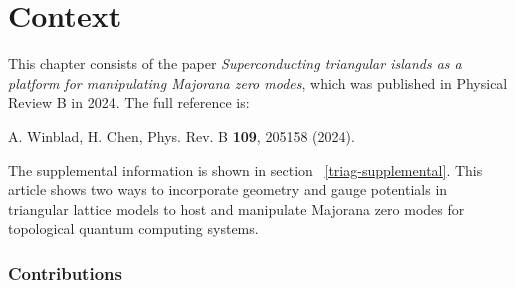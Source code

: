 \section{Context}

This chapter consists of the paper \textit{Superconducting triangular islands as a platform for manipulating Majorana zero modes}, which was published in Physical Review B in 2024. The full reference is:

A. Winblad, H. Chen, Phys. Rev. B \textbf{109}, 205158 (2024).

The supplemental information is shown in section ~\ref{triag-supplemental}.
This article shows two ways to incorporate geometry and gauge potentials in triangular lattice models to host and manipulate Majorana zero modes for topological quantum computing systems.

\subsubsection{Contributions}

